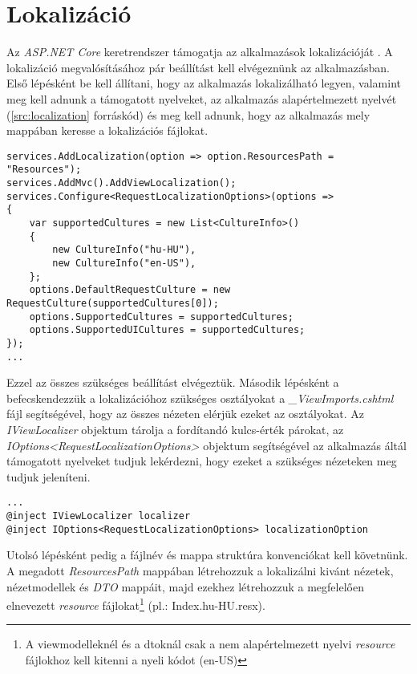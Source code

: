 \section{Lokalizáció}
\label{sec:localization}
Az \emph{ASP.NET Core} keretrendszer támogatja az alkalmazások lokalizációját \cite{Localization}. A lokalizáció megvalósításához pár beállítást kell elvégeznünk az alkalmazásban. Első lépésként be kell állítani, hogy az alkalmazás lokalizálható legyen, valamint meg kell adnunk a támogatott nyelveket, az alkalmazás alapértelmezett nyelvét (\ref{src:localization} forráskód) és meg kell adnunk, hogy az alkalmazás mely mappában keresse a lokalizációs fájlokat.
\begin{lstlisting}[language={[Sharp]C}]
services.AddLocalization(option => option.ResourcesPath = "Resources");
services.AddMvc().AddViewLocalization();
services.Configure<RequestLocalizationOptions>(options =>
{
	var supportedCultures = new List<CultureInfo>()
	{
		new CultureInfo("hu-HU"),
		new CultureInfo("en-US"),
	};
	options.DefaultRequestCulture = new RequestCulture(supportedCultures[0]);
	options.SupportedCultures = supportedCultures;
	options.SupportedUICultures = supportedCultures;
});
...
\end{lstlisting}
Ezzel az összes szükséges beállítást elvégeztük. Második lépésként a befecskendezzük a lokalizációhoz szükséges osztályokat a \emph{\_ViewImports.cshtml} fájl segítségével, hogy az összes nézeten elérjük ezeket az osztályokat. Az \emph{IViewLocalizer} objektum tárolja a fordítandó kulcs-érték párokat, az \emph{IOptions<RequestLocalizationOptions>} objektum segítségével az alkalmazás áltál támogatott nyelveket tudjuk lekérdezni, hogy ezeket a szükséges nézeteken meg tudjuk jeleníteni.
\begin{lstlisting}[language={[Sharp]C}]
...
@inject IViewLocalizer localizer
@inject IOptions<RequestLocalizationOptions> localizationOption
\end{lstlisting}
Utolsó lépésként pedig a fájlnév és mappa struktúra konvenciókat kell követnünk. A megadott \emph{ResourcesPath} mappában létrehozzuk a lokalizálni kivánt nézetek, nézetmodellek és \emph{DTO} mappáit, majd ezekhez létrehozzuk a megfelelően elnevezett \emph{resource} fájlokat\footnote{A viewmodelleknél és a dtoknál csak a nem alapértelmezett nyelvi \emph{resource} fájlokhoz kell kitenni a nyeli kódot (en-US)} (pl.: Index.hu-HU.resx).
